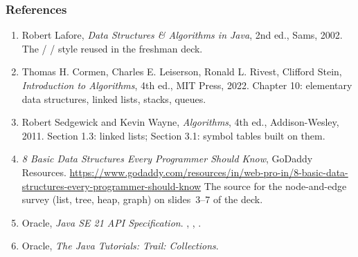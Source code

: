 \documentclass[aspectratio=169,10pt,compress]{beamer}
\begin{document}
\begin{frame}[t,fragile] \frametitle{References}
  \begin{enumerate}\small
    \item Robert Lafore, \emph{Data Structures \& Algorithms in Java},
          2nd ed., Sams, 2002.
          \newline
          The  /  / 
          style reused in the freshman deck.
    \item Thomas H. Cormen, Charles E. Leiserson, Ronald L. Rivest,
          Clifford Stein, \emph{Introduction to Algorithms}, 4th ed.,
          MIT Press, 2022.
          \newline
          Chapter 10: elementary data structures, linked lists,
          stacks, queues.
    \item Robert Sedgewick and Kevin Wayne, \emph{Algorithms},
          4th ed., Addison-Wesley, 2011.
          \newline
          Section 1.3: linked lists; Section 3.1: symbol tables
          built on them.
    \item \emph{8 Basic Data Structures Every Programmer Should Know},
          GoDaddy Resources.
          \newline
          \url{https://www.godaddy.com/resources/in/web-pro-in/8-basic-data-structures-every-programmer-should-know}
          \newline
          The source for the node-and-edge survey (list, tree,
          heap, graph) on slides~3--7 of the deck.
    \item Oracle, \emph{Java SE 21 API Specification}.
          \newline
          , ,
          .
    \item Oracle, \emph{The Java Tutorials: Trail: Collections}.
  \end{enumerate}
\end{frame}

\begin{frame}[t,fragile]
  \begin{center}\vspace{4cm}\end{center}
\end{frame}
\end{document}
